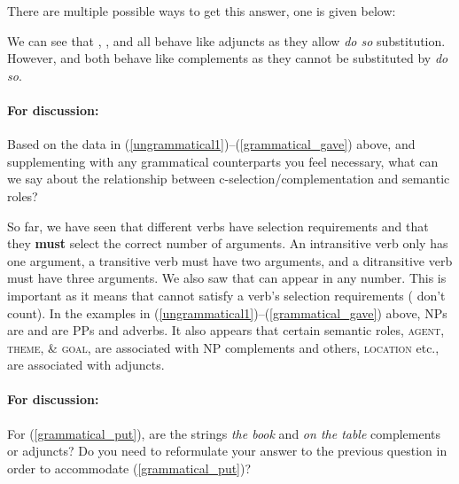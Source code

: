 \documentclass{article}
\begin{document}
\begin{answer}{
There are multiple possible ways to get this answer, one is given below:
\begin{exe}
\end{exe}
We can see that , , and  all behave like adjuncts as they allow \emph{do so} substitution.
However,  and  both behave like complements as they cannot be substituted by \emph{do so}.
}
\end{answer}

\paragraph{For discussion:} Based on the data in (\ref{ungrammatical1})--(\ref{grammatical_gave}) above, and supplementing with any grammatical counterparts you feel necessary, what can we say about the relationship between c-selection/complementation and semantic roles?

\begin{answer}
{
So far, we have seen that different verbs have selection requirements and that they \textbf{must} select the correct number of arguments.
An intransitive verb only has one argument, a transitive verb must have two arguments, and a ditransitive verb must have three arguments.
We also saw that  can appear in any number.
This is important as it means that cannot satisfy a verb's selection requirements ( don't count).
In the examples in (\ref{ungrammatical1})--(\ref{grammatical_gave}) above, NPs are  and  are PPs and adverbs.
It also appears that certain semantic roles, \textsc{agent}, \textsc{theme}, \& \textsc{goal}, are associated with NP complements and others, \textsc{location} etc., are associated with adjuncts. }
\end{answer}

\paragraph{For discussion:} For (\ref{grammatical_put}), are the strings \emph{the book} and \emph{on the table} complements or adjuncts? 
Do you need to reformulate your answer to the previous question in order to accommodate (\ref{grammatical_put})?
\begin{exe}
    \label{grammatical_put}
\end{exe}
\end{document}
